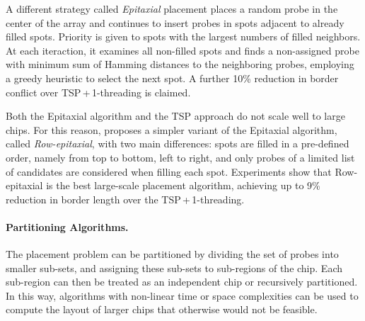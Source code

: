 \documentclass{llncs}
\newcommand{\ignore}[1]{}
\begin{document}
A different strategy called \emph{Epitaxial} placement
\cite{KAHNG02} places a random probe in the center of the array and continues
to insert probes in spots adjacent to already filled spots. Priority is given
to spots with the largest numbers of filled neighbors. At each iteraction, it
examines all non-filled spots and finds a non-assigned probe with
minimum sum of Hamming distances to the neighboring probes, employing
a greedy heuristic to select the next spot.  A further 10\% reduction in
border conflict over TSP\,+\,1-threading is claimed.

\ignore{
The major problem with the Epitaxial and the TSP-based algorithm is that they
have at least quadratic time complexity and thus are not scalable for the
latest million-probe microarrays. According to their experiments, the TSP
approach needed around 32 minutes to produce the layout of a 200\,x\,200
chip, whereas the Epitaxial algorithm needed 74 minutes on average. For a
500\,x\,500 chip, the TSP took over 30 hours to complete, whereas the
Epitaxial algorithm did not complete ``due to prohibitively large running
time or memory requirements'' \cite{KAHNG02}.
}

\ignore{
This observation has led to the development of two new algorithms by
\cite{KAHNG03A}. The first one, called Sliding-window Matching (SWM), is not
exactly a placement algorithm as it iteratively improves an initial placement
that can be constructed by, for instance, TSP and 1-threading. Improvements
are achieved by selecting an independent set of spots inside the window and
optimally replacing their probes using a minimum-weight perfect matching
algorithm. The term independent refers to probes that can be replaced without
affecting the border length of the other selected probes.
}

Both the Epitaxial algorithm and the TSP approach do not scale well to large
chips. For this reason, \cite{KAHNG03A} proposes a simpler variant of the
Epitaxial algorithm, called \emph{Row-epitaxial}, with two main differences:
spots are filled in a pre-defined order, namely from top to bottom, left to
right, and only probes of a limited list of candidates are considered when
filling each spot. Experiments show that Row-epitaxial is the best
large-scale placement algorithm, achieving up to 9\% reduction in border
length over the TSP\,+\,1-threading.


\paragraph{Partitioning Algorithms.}
The placement problem can be partitioned by dividing the set of probes into
smaller sub-sets, and assigning these sub-sets to sub-regions of the chip.
Each sub-region can then be treated as an independent chip or recursively
partitioned. In this way, algorithms with non-linear time or space
complexities can be used to compute the layout of larger chips that otherwise
would not be feasible.
\end{document}
